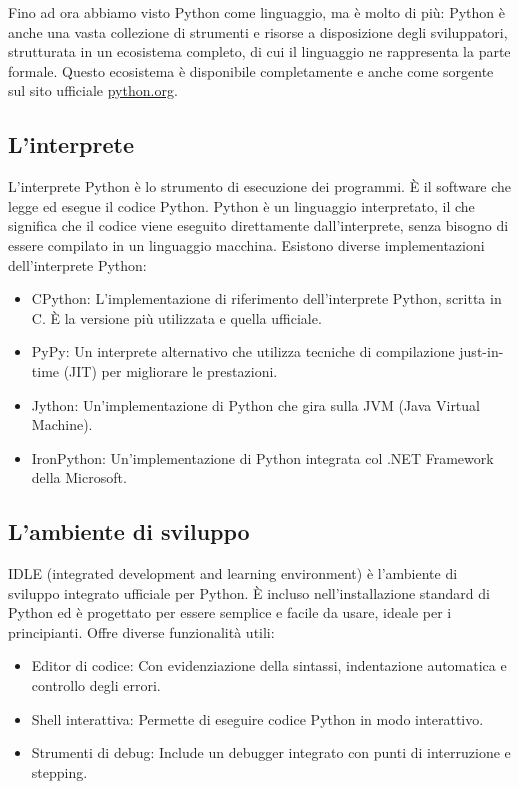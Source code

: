 \documentclass[
  letterpaper,
  DIV=11,
  numbers=noendperiod]{scrreprt}
\providecommand{\tightlist}{%
  \setlength{\itemsep}{0pt}\setlength{\parskip}{0pt}}\usepackage{longtable,booktabs,array}
\begin{document}
Fino ad ora abbiamo visto Python come linguaggio, ma è molto di più:
Python è anche una vasta collezione di strumenti e risorse a
disposizione degli sviluppatori, strutturata in un ecosistema completo,
di cui il linguaggio ne rappresenta la parte formale. Questo ecosistema
è disponibile completamente e anche come sorgente sul sito ufficiale
\href{https://www.python.org/}{python.org}.

\subsection{L'interprete}\label{linterprete}

L'interprete Python è lo strumento di esecuzione dei programmi. È il
software che legge ed esegue il codice Python. Python è un linguaggio
interpretato, il che significa che il codice viene eseguito direttamente
dall'interprete, senza bisogno di essere compilato in un linguaggio
macchina. Esistono diverse implementazioni dell'interprete Python:

\begin{itemize}
\tightlist
\item
  CPython: L'implementazione di riferimento dell'interprete Python,
  scritta in C. È la versione più utilizzata e quella ufficiale.
\item
  PyPy: Un interprete alternativo che utilizza tecniche di compilazione
  just-in-time (JIT) per migliorare le prestazioni.
\item
  Jython: Un'implementazione di Python che gira sulla JVM (Java Virtual
  Machine).
\item
  IronPython: Un'implementazione di Python integrata col .NET Framework
  della Microsoft.
\end{itemize}

\subsection{L'ambiente di sviluppo}\label{lambiente-di-sviluppo}

IDLE (integrated development and learning environment) è l'ambiente di
sviluppo integrato ufficiale per Python. È incluso nell'installazione
standard di Python ed è progettato per essere semplice e facile da
usare, ideale per i principianti. Offre diverse funzionalità utili:

\begin{itemize}
\tightlist
\item
  Editor di codice: Con evidenziazione della sintassi, indentazione
  automatica e controllo degli errori.
\item
  Shell interattiva: Permette di eseguire codice Python in modo
  interattivo.
\item
  Strumenti di debug: Include un debugger integrato con punti di
  interruzione e stepping.
\end{itemize}
\end{document}
